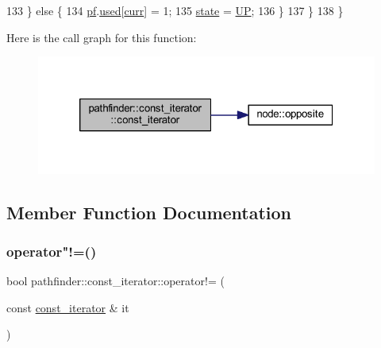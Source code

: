 \begin{DoxyCode}
133     \} \textcolor{keywordflow}{else} \{
134         \mbox{\hyperlink{classpathfinder_1_1const__iterator_a913c0268881f3da2ae1b95165a21a85d}{pf}}.\mbox{\hyperlink{classpathfinder_a56f89e20fad902b7719c4ef552d4589f}{used}}[\mbox{\hyperlink{classpathfinder_1_1const__iterator_a76b08ac8c5b5055b95cc37d5a14d54e4}{curr}}] = 1;
135         \mbox{\hyperlink{classpathfinder_1_1const__iterator_aa63c53f506ead02a0147e88f02b909cd}{state}} = \mbox{\hyperlink{classpathfinder_1_1const__iterator_a0f4ffc8bec85488c37e68ddb247e6e47a4670c4ef84626de9e51910103fe0bef0}{UP}};
136     \}
137     \}
138 \}
\end{DoxyCode}
Here is the call graph for this function\+:\nopagebreak
\begin{figure}[H]
\begin{center}
\leavevmode
\includegraphics[width=320pt]{classpathfinder_1_1const__iterator_acbaabfa04503076ff34db02d03c2e05e_cgraph}
\end{center}
\end{figure}


\subsection{Member Function Documentation}
\mbox{\label{classpathfinder_1_1const__iterator_a350c813ed1fbaa12cb90e459819894d0}} 
\subsubsection{\texorpdfstring{operator"!=()}{operator!=()}}
{\footnotesize\ttfamily bool pathfinder\+::const\+\_\+iterator\+::operator!= (\begin{DoxyParamCaption}\item[{const \mbox{\hyperlink{classpathfinder_1_1const__iterator}{const\+\_\+iterator}} \&}]{it }\end{DoxyParamCaption})\hspace{0.3cm}{\ttfamily [inline]}}



